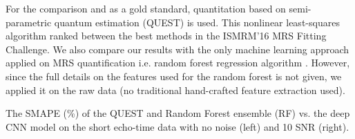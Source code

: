 \documentclass{llncs}
\begin{document}
For the comparison and as a gold standard, quantitation based on semi-parametric quantum estimation (QUEST) \cite{quest} is used. This nonlinear least-squares algorithm ranked between the best methods in the ISMRM'16 MRS Fitting Challenge. %
We also compare our results with the only machine learning approach applied on MRS quantification i.e. random forest regression algorithm \cite{das2017}. However, since the full details on the features used for the random forest is not given, we applied it on the raw data (no traditional hand-crafted feature extraction used). 


\begin{table*}
\tiny
\caption{The SMAPE (\%) of the QUEST and Random Forest ensemble (RF) vs. the deep CNN model on the short echo-time data with no noise (left) and 10 SNR (right).}


\end{table*}
\end{document}
